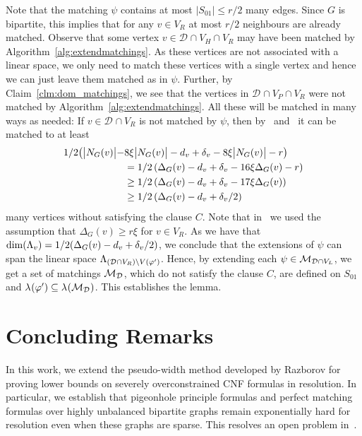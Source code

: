 \documentclass{article}
\providecommand{\Abs}[1]{\bigl\lvert#1\bigr\rvert}
\newcommand{\Setsize}[1]{\bigl\lvert#1\bigr\rvert}
\newcommand{\setsize}[1]{\lvert#1\rvert}
\newcommand{\neigh}[2][]{N_{{#1}}(#2)}
\renewcommand{\deg}[2][XXXXXXXXXXXX]{\Delta_{#1}(#2)}
\newcommand{\diff}{\xi}
\newcommand{\ontodimLi}{1/2(\deg[G]{v} - d_v + \delta_v/2)}
\newcommand{\V}[1][]{V_{#1}}
\newcommand{\Vl}{\V[L]}
\newcommand{\Vr}{\V[R]}
\newcommand{\Vp}{\V[P]}
\newcommand{\Vh}{\V[H]}
\newcommand{\thr}[1]{ \ensuremath d_{{#1}} }
\newcommand{\adv}[1]{\delta_{{#1}}}
\newcommand{\linspace}[1][]{\ensuremath \Lambda_{{#1}}}
\newcommand{\linmap}[1][]{\ensuremath \lambda_{{#1}}}
\newcommand{\linmapof}[2][]{\linmap[#1](#2)}
\newcommand{\pseudowidth}{pseudo-width\xspace}
\newcommand{\diffclosure}[1][]{D_{{#1}}}
\renewcommand{\diffclosure}[1][]{\mathcal{D}_{{#1}}}
\newcommand{\vmatch}[1]{V(#1)}
\newcommand{\matchb}{\varphi'}
\newcommand{\matchc}{\psi}
\newcommand{\matchings}[1][]{\ensuremath \mathcal{M}_{{#1}}}
\numberwithin{equation}{section}
\begin{document}
  Note that the matching $\matchc$ contains at most 
  $\setsize{S_{01}} \leq r/2$ many edges. 
  Since $G$ is bipartite, this implies that for any $v \in \Vr$ at most 
  $r / 2$ neighbours are already matched.
  Observe that some vertex
  $v \in \diffclosure \cap \Vh \cap \Vr$ 
  may have been matched by Algorithm~\ref{alg:extendmatchings}. As
  these vertices are not associated with a linear space, we only need
  to match these vertices with a single vertex and hence we can just leave them
  matched as in $\matchc$.
  Further, by Claim~\ref{clm:dom_matchings},
  we see that the vertices in $\diffclosure \cap \Vp \cap \Vr$ were
  not matched by Algorithm~\ref{alg:extendmatchings}. All these will
  be matched in many ways as needed:
  If $v \in \diffclosure \cap \Vr$ is not matched by $\matchc$, then 
  by~ and~ it can 
  be matched to at least
  \begin{align}
  \nonumber
  	1/2 \big( \Setsize{ \neigh[G]{v} } - 
  	&8 \diff \Setsize{ \neigh[G]{v} }  - 
  	\thr{v} + \adv{v} - 8 \diff  \Abs{ \neigh[G]{v} } - r \big)\\
    \nonumber
  	&= 1/2 \left( \deg[G]{v} - \thr{v} + \adv{v} - 
  	16\diff\deg[G]{v} - r\right) \\
  	&\ge 1/2 \left( \deg[G]{v} - \thr{v} + \adv{v} - 
  	17\diff\deg[G]{v} \right)\label{eq:rsmall} \\
  	\nonumber
  	&\ge 1/2 \left( \deg[G]{v} - \thr{v} + \adv{v}/2\right)
  \end{align}
  many vertices without satisfying the clause $C$. 
  Note that in~ we used the assumption 
  that $\deg[G]{v} \ge r \diff$ for $v \in \Vr$. 
  As we have that
  $\dim(\linspace[v]) = \ontodimLi$, we conclude that
  the extensions of $\psi$ can span the linear space
  $\linspace[(\diffclosure \cap \Vr) \setminus \vmatch{\matchb}]$.
  Hence, by extending each $\matchc \in \matchings[\diffclosure \cap \Vl]$,
  we get a set of matchings $\matchings[\diffclosure]$, which do not satisfy the
  clause $C$, are defined on $S_{01}$ and 
  $\linmapof{\matchb} \subseteq \linmapof{\matchings[\diffclosure]}$.
  This establishes the lemma.
 


\section{Concluding Remarks}
\label{sec:conclusion}

In this work, we extend the \pseudowidth method developed by 
Razborov \cite{Razborov04ResolutionLowerBoundsPM,Razborov03ResolutionLowerBoundsWFPHP} 
for proving lower bounds on severely overconstrained CNF formulas in
resolution.
In particular, we establish that pigeonhole principle formulas and
perfect matching formulas over highly unbalanced bipartite graphs 
remain exponentially hard for resolution even when these graphs are sparse.
This resolves an open problem in~\cite{Razborov04ResolutionLowerBoundsPM}.
\end{document}
